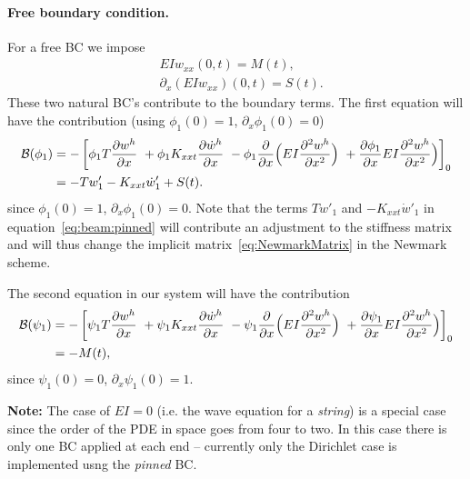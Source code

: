 \documentclass[11pt]{article}
\begin{document}
\paragraph{Free boundary condition.} For a free BC we impose
\begin{align}
&    E I w_{xx}(0,t)=M(t), \\
&   \partial_x( E I w_{xx})(0,t)=S(t) .
\end{align}
These two natural BC's contribute to the boundary terms.
The first equation will have the contribution (using $\phi_1(0)=1$, $\partial_x\phi_1(0)=0$)
\begin{align}
   \mathcal{B}(\phi_1) &= -\left[ \phi_1 T \frac{\partial w^h}{\partial x} 
                      ~ + \phi_1 K_{xxt} \frac{\partial \dot w^h}{\partial x}  
                      ~ - \phi_1 \frac{\partial}{\partial x}\Big( E I \frac{\partial^2 w^h}{\partial x^2}\Big) 
                      ~ + \frac{\partial \phi_1}{\partial x}E I \frac{\partial^2 w^h}{\partial x^2}\Big)  
                      \right]_0  \\
     &=  -T w'_1 - K_{xxt} \dot w'_1  + S(t) . \label{eq:beam:pinned}
\end{align}
since $\phi_1(0)=1$, $\partial_x\phi_1(0)=0$.
Note that the terms $T w'_1$ and $- K_{xxt} \dot w'_1$
in equation~\eqref{eq:beam:pinned} will contribute an adjustment to the stiffness matrix
and will thus change the implicit matrix~\eqref{eq:NewmarkMatrix} in the Newmark scheme.


The second equation in our system will have the contribution 
\begin{align}
   \mathcal{B}(\psi_1) &= -\left[\psi_1 T \frac{\partial w^h}{\partial x} 
                      ~ + \psi_1 K_{xxt} \frac{\partial \dot w^h}{\partial x} 
                      ~ - \psi_1 \frac{\partial}{\partial x}\Big( E I \frac{\partial^2 w^h}{\partial x^2}\Big) 
                      ~ + \frac{\partial \psi_1}{\partial x}E I \frac{\partial^2 w^h}{\partial x^2}\Big)  
                      \right]_0 \\
        &= - M(t) , 
\end{align}
since $\psi_1(0)=0$, $\partial_x\psi_1(0)=1$.

{\bf Note:} The case of $E I= 0$ (i.e. the wave equation for a {\em string}) 
is a special case since the order of the PDE in space goes from four to two. In this
case there is only one BC applied at each end -- currently only the Dirichlet case
is implemented usng the {\em pinned} BC. 
\end{document}
